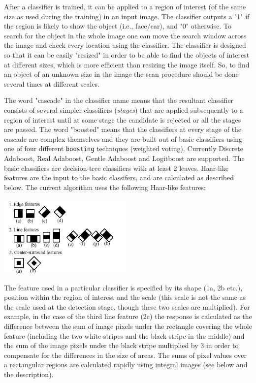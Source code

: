 After a classifier is trained, it can be applied to a region of interest
(of the same size as used during the training) in an input image. The
classifier outputs a "1" if the region is likely to show the object
(i.e., face/car), and "0" otherwise. To search for the object in the
whole image one can move the search window across the image and check
every location using the classifier. The classifier is designed so that
it can be easily "resized" in order to be able to find the objects of
interest at different sizes, which is more efficient than resizing the
image itself. So, to find an object of an unknown size in the image the
scan procedure should be done several times at different scales.

The word "cascade" in the classifier name means that the resultant
classifier consists of several simpler classifiers (\emph{stages}) that
are applied subsequently to a region of interest until at some stage the
candidate is rejected or all the stages are passed. The word "boosted"
means that the classifiers at every stage of the cascade are complex
themselves and they are built out of basic classifiers using one of four
different \texttt{boosting} techniques (weighted voting). Currently
Discrete Adaboost, Real Adaboost, Gentle Adaboost and Logitboost are
supported. The basic classifiers are decision-tree classifiers with at
least 2 leaves. Haar-like features are the input to the basic classifers,
and are calculated as described below. The current algorithm uses the
following Haar-like features:

\includegraphics[width=0.5\textwidth]{pics/haarfeatures.png}

The feature used in a particular classifier is specified by its shape (1a, 2b etc.), position within the region of interest and the scale (this scale is not the same as the scale used at the detection stage, though these two scales are multiplied). For example, in the case of the third line feature (2c) the response is calculated as the difference between the sum of image pixels under the rectangle covering the whole feature (including the two white stripes and the black stripe in the middle) and the sum of the image pixels under the black stripe multiplied by 3 in order to compensate for the differences in the size of areas. The sums of pixel values over a rectangular regions are calculated rapidly using integral images (see below and the  description).

